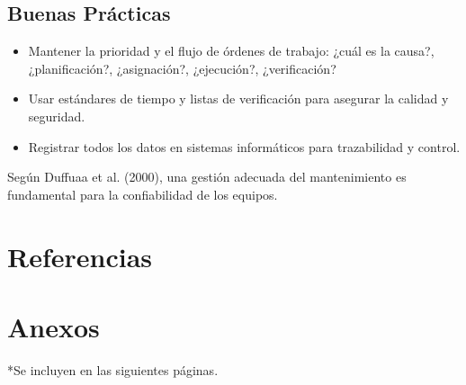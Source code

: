 \documentclass[12pt,letterpaper]{article}
\begin{document}
\subsection{Buenas Prácticas}
\begin{itemize}
    \item Mantener la prioridad y el flujo de órdenes de trabajo: ¿cuál es la causa?, ¿planificación?, ¿asignación?, ¿ejecución?, ¿verificación?
    \item Usar estándares de tiempo y listas de verificación para asegurar la calidad y seguridad.
    \item Registrar todos los datos en sistemas informáticos para trazabilidad y control.
\end{itemize}

Según Duffuaa et al. (2000), una gestión adecuada del mantenimiento es fundamental para la confiabilidad de los equipos.\parencite{duffuaa2000}



\newpage
\section{Referencias}
\printbibliography
\section{Anexos}
*Se incluyen en las siguientes páginas.
\end{document}
